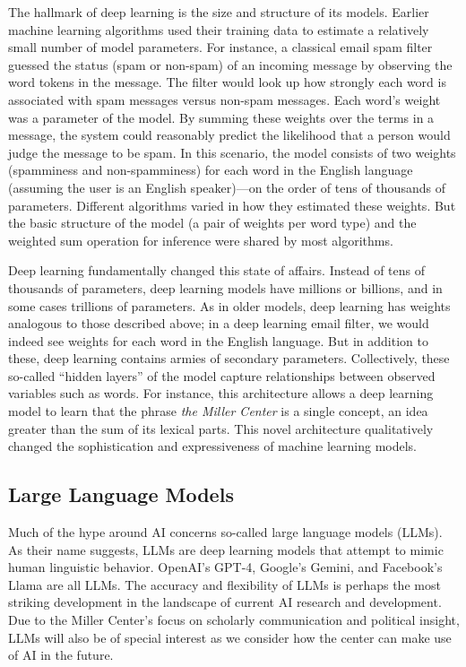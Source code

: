 \documentclass[12pt, oneside]{article}   	%
\begin{document}
The hallmark of deep learning is the size and structure of its models.  Earlier machine learning algorithms used their training data to estimate a relatively small number of model parameters.  For instance, a classical email spam filter guessed the status (spam or non-spam) of an incoming message by observing the word tokens in the message.  The filter would look up how strongly each word is associated with spam messages versus non-spam messages.  Each word's weight was a parameter of the model. By summing these weights over the terms in a message, the system could reasonably predict the likelihood that a person would judge the message to be spam.  In this scenario, the model consists of two weights (spamminess and non-spamminess) for each word in the English language (assuming the user is an English speaker)---on the order of tens of thousands of parameters.  Different algorithms varied in how they estimated these weights.  But the basic structure of the model (a pair of weights per word type) and the weighted sum operation for inference  were shared by most algorithms.

Deep learning fundamentally changed this state of affairs.  Instead of tens of thousands of parameters, deep learning models have millions or billions, and in some cases trillions of parameters.  As in older models, deep learning has weights analogous to those described above; in a deep learning email filter, we would indeed see weights for each word in the English language.  But in addition to these, deep learning contains armies of secondary parameters.  Collectively, these so-called “hidden layers'' of the model capture relationships between observed variables such as words.  For instance, this architecture allows a deep learning model to learn that the phrase  \emph{the Miller Center} is a single concept, an idea greater than the sum of its lexical parts.  This novel architecture qualitatively changed the sophistication and expressiveness of machine learning models.



\subsection{Large Language Models}\label{section.definitions.llms}
Much of the hype around AI concerns so-called large language models (LLMs).  As their name suggests, LLMs are deep learning models that attempt to mimic human linguistic behavior.  OpenAI’s GPT-4, Google’s Gemini, and Facebook’s Llama are all LLMs.  The accuracy and flexibility of LLMs is perhaps the most striking development in the landscape of current AI research and development.  Due to the Miller Center’s focus on scholarly communication and political insight, LLMs will also be of special interest as we consider how the center can make use of AI in the future.
\end{document}
